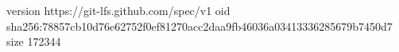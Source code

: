 version https://git-lfs.github.com/spec/v1
oid sha256:78857cb10d76e62752f0ef81270acc2daa9fb46036a03413336285679b7450d7
size 172344
